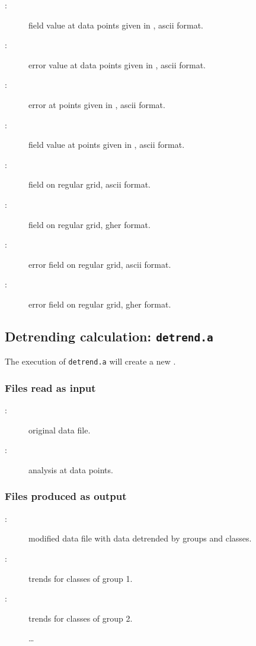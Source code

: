 \begin{description}
\item[:]			field value at data points given in , ascii format.				
\item[:]			error value at data points given in , ascii format.					
\item[:]			error at points given in , ascii format.			
\item[:]			field value at points given in , ascii format.					
\item[:]			field on regular grid, ascii format.
\item[:]			field on regular grid, gher format.					
\item[:]			error field on regular grid, ascii format.					
\item[:]			error field on regular grid, gher format.	
 				
\end{description}						



\subsection{Detrending calculation: \texttt{detrend.a}}

The execution of \texttt{detrend.a} will create a new .  

\subsubsection{Files read as input}

\begin{description}
\item[:] original data file. 
\item[:] analysis at data points. 

\end{description}
 
\subsubsection{Files produced as output}

\begin{description}
\item[:] modified data file with data detrended by groups and classes. 
\item[:] trends for classes of group 1. 
\item[:] trends for classes of group 2.
\item[] \ldots
\end{description}



